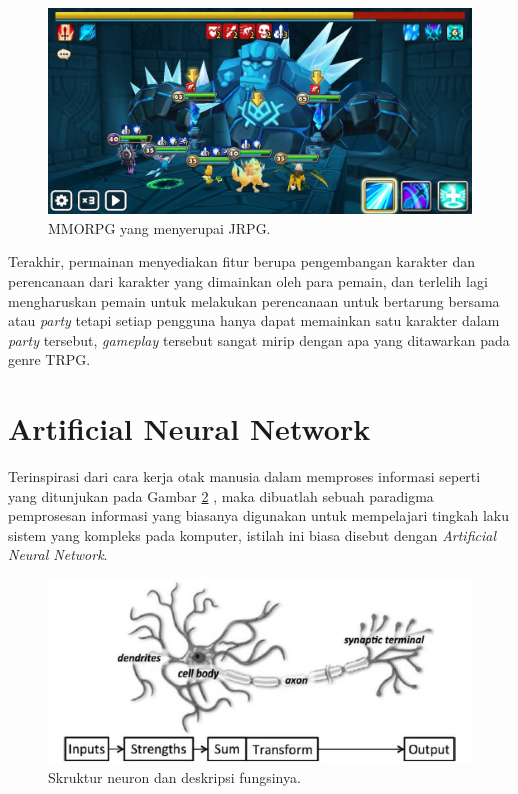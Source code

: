 \begin{figure} [!h] \centering
	\includegraphics[scale=0.28]{img/sw.jpg}
	\caption{MMORPG yang menyerupai JRPG.}
	\label{fig:sw}
\end{figure}

Terakhir, permainan menyediakan fitur berupa pengembangan karakter dan perencanaan dari karakter yang dimainkan oleh para pemain, dan terlelih lagi mengharuskan pemain untuk melakukan perencanaan untuk bertarung bersama atau \textit{party} tetapi setiap pengguna hanya dapat memainkan satu karakter dalam \textit{party} tersebut, \textit{gameplay} tersebut sangat mirip dengan apa yang ditawarkan pada genre TRPG.
\vspace{1ex}

\section{Artificial Neural Network}
\label{sec:sec2_ann}
\vspace{1ex}

Terinspirasi dari cara kerja otak manusia dalam memproses informasi seperti yang ditunjukan pada Gambar \ref{fig:ann_neuron} \citep{buduma2017}, maka dibuatlah sebuah paradigma pemprosesan informasi yang biasanya digunakan untuk mempelajari tingkah laku sistem yang kompleks pada komputer, istilah ini biasa disebut dengan \textit{Artificial Neural Network}.
\vspace{1ex}

\begin{figure} [!h] \centering
	\includegraphics[scale=0.65]{img/ann_neuron.png}
	\caption{Skruktur neuron dan deskripsi fungsinya.}
	\label{fig:ann_neuron}
\end{figure}

